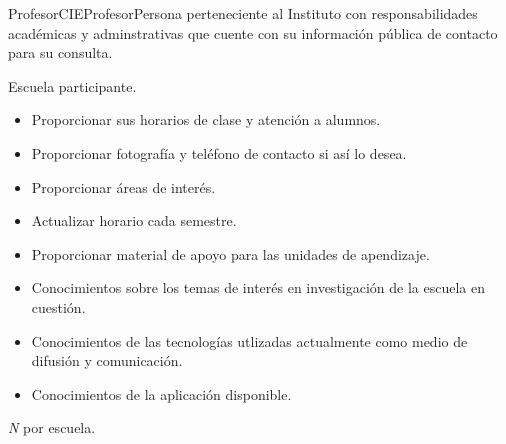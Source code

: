 \begin{actor}{Profesor}{CIEProfesor}{Persona perteneciente al Instituto con responsabilidades académicas y adminstrativas que cuente con su información pública de contacto para su consulta.}
	
	\item[Área:] Escuela participante.
	\item[Responsabilidades:] \hspace{1pt}
	
	\begin{itemize}
		
		\item Proporcionar sus horarios de clase y atención a alumnos.
		\item Proporcionar fotografía y teléfono de contacto si así lo desea.
		\item Proporcionar áreas de interés.
		\item Actualizar horario cada semestre.
		\item Proporcionar material de apoyo para las unidades de apendizaje.
		
	\end{itemize}
	
	\item[Perfil:] \hspace{1pt}
	
	\begin{itemize}
		
		\item Conocimientos sobre los temas de interés en investigación de la escuela en cuestión.
		\item Conocimientos de las tecnologías utlizadas actualmente como medio de difusión y comunicación.
		\item Conocimientos de la aplicación disponible.
		
	\end{itemize}
	
	\item[Cantidad:] \textit{N} por escuela.
	
\end{actor}

